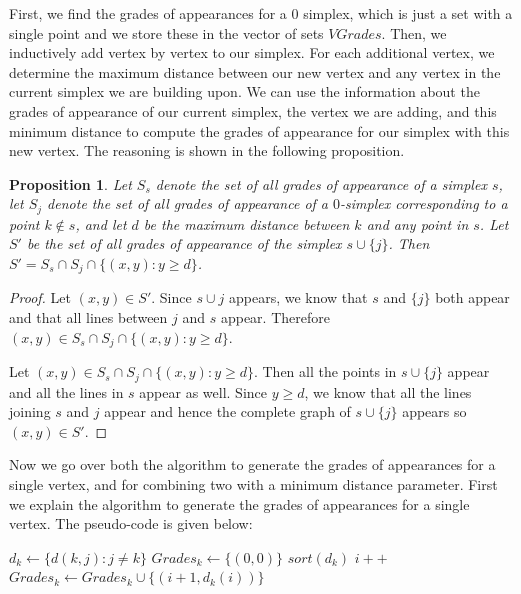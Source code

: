 \documentclass[12pt]{amsart}
\newtheorem{proposition}[theorem]{Proposition}
\theoremstyle{definition}
\theoremstyle{remark}
\begin{document}
First, we find the grades of appearances for a $0$ simplex, which is just a set with a single point and we store these in the vector of sets $VGrades$. Then, we inductively add vertex by vertex to our simplex. For each additional vertex, we determine the maximum distance between our new vertex and any vertex in the current simplex we are building upon. We can use the information about the grades of appearance of our current simplex, the vertex we are adding, and this minimum distance to compute the grades of appearance for our simplex with this new vertex. The reasoning is shown in the following proposition.

\begin{proposition}
	Let $S_s$ denote the set of all grades of appearance of a simplex $s$, let $S_j$ denote the set of all grades of appearance of a $0$-simplex corresponding to a point $k \not \in s$, and let $d$ be the maximum distance between $k$ and any point in $s$. Let $S'$ be the set of all grades of appearance of the simplex $s \cup \{j\}$. Then $S' = S_s \cap S_j \cap \{(x, y) : y \ge d\}$.
\end{proposition}
\begin{proof}
	Let $(x, y) \in S'$. Since $s \cup {j}$ appears, we know that $s$ and $\{j\}$ both appear and that all lines between $j$ and $s$ appear. Therefore $(x, y) \in S_s \cap S_j \cap \{(x, y): y \ge d\}$.
	
	Let $(x, y) \in S_s \cap S_j \cap \{(x, y): y \ge d\}$. Then all the points in $s \cup \{j\}$ appear and all the lines in $s$ appear as well. Since $y \ge d$, we know that all the lines joining $s$ and $j$ appear and hence the complete graph of $s \cup \{j\}$ appears so $(x, y) \in S'$.
\end{proof}

Now we go over both the algorithm to generate the grades of appearances for a single vertex, and for combining two with a minimum distance parameter. First we explain the algorithm to generate the grades of appearances for a single vertex. The pseudo-code is given below:

\begin{algorithmic}
			\State $d_k \gets \{d(k, j) : j \neq k\}$
			\State $Grades_k \gets \{(0, 0)\}$
			\State $sort(d_k)$
					\State $i++$
				\EndWhile
				\State $Grades_k \gets Grades_k \cup \{(i + 1, d_k(i))\}$
			\EndFor
		\EndFor
	\EndFunction
\end{algorithmic}
\end{document}
